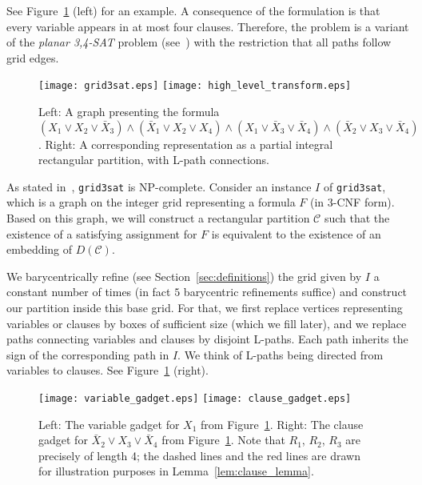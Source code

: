 \documentclass[12pt]{article}
\newcommand{\partition}{\mathcal{C}}
\begin{document}
See Figure~\ref{fig:grid3sat} (left) for an example.
A consequence of the formulation is that every variable appears in at most four clauses.
Therefore, the problem is a variant of the \emph{planar 3,4-SAT} problem
(see~\cite{godau-difficulty})
with the restriction that all paths follow grid edges. 

\begin{figure}
\centering
\texttt{[image: grid3sat.eps]}
\hspace{1cm}
\texttt{[image: high\_level\_transform.eps]}
\caption{Left: A graph presenting the formula $(X_1\vee X_2\vee \bar{X}_3)\wedge(\bar{X}_1\vee X_2\vee X_4)\wedge(X_1\vee\bar{X}_3\vee\bar{X}_4)\wedge(\bar{X}_2\vee X_3\vee\bar{X}_4)$.
Right: A corresponding representation as a partial integral rectangular partition, with
L-path connections.}
\label{fig:grid3sat}
\end{figure}

As stated in~\cite{godau-difficulty}, \texttt{grid3sat} is NP-complete.
Consider an instance $I$ of \texttt{grid3sat},
which is a graph on the integer grid representing a formula $F$ (in 3-CNF form).
Based on this graph, we will construct a rectangular partition $\partition$ such that the existence
of a satisfying assignment for $F$ is equivalent to the existence of an
embedding of $D(\partition)$. 

We barycentrically refine (see Section~\ref{sec:definitions}) the grid
given by $I$ a constant number of times 
(in fact $5$ barycentric refinements suffice) and construct our partition inside
this base grid. For that, we first replace vertices representing variables or clauses
by boxes of sufficient size (which we fill later), and we replace paths connecting
variables and clauses by disjoint L-paths. 
Each path inherits the sign of the corresponding path in $I$.
We think of L-paths being
directed from variables to clauses. See Figure~\ref{fig:grid3sat} (right).

\begin{figure}
\centering
\texttt{[image: variable\_gadget.eps]}
\hspace{1cm}
\texttt{[image: clause\_gadget.eps]}
\caption{Left: The variable gadget for $X_1$ from Figure~\ref{fig:grid3sat}.
Right: The clause gadget for $\bar{X}_2\vee X_3\vee\bar{X}_4$ from Figure~\ref{fig:grid3sat}.
Note that $R_1$, $R_2$, $R_3$ are precisely of length 4; the dashed lines and the red lines
are drawn for illustration purposes in Lemma~\ref{lem:clause_lemma}.
}
\label{fig:gadgets}
\end{figure}
\end{document}
